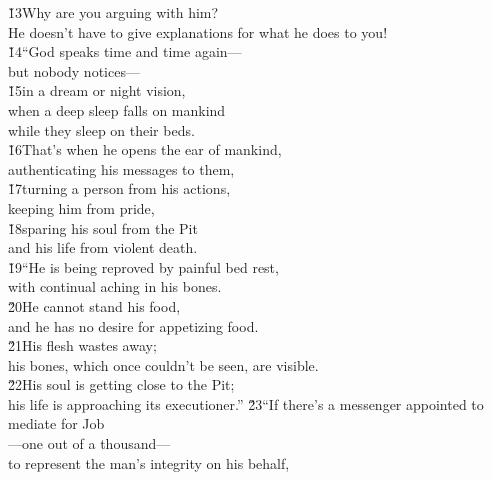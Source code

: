 \begin{poetry}
\poeml \v{13}Why are you arguing with him? \\
\poemll    He doesn't have to give explanations for what he does to you! \\
\poeml \v{14}``God speaks time and time again--- \\
\poemll    but nobody notices--- \\
\poeml \v{15}in a dream or night vision, \\
\poemll    when a deep sleep falls on mankind \\
\poemlll       while they sleep on their beds. \\
\poeml \v{16}That's when he opens the ear of mankind, \\
\poemll    authenticating his messages to them, \\
\poeml \v{17}turning a person from his actions, \\
\poemll    keeping him from pride, \\
\poeml \v{18}sparing his soul from the Pit \\
\poemll    and his life from violent death. \\
\poeml \v{19}``He is being reproved by painful bed rest, \\
\poemll    with continual aching in his bones. \\
\poeml \v{20}He cannot stand his food, \\
\poemll    and he has no desire for appetizing food. \\
\poeml \v{21}His flesh wastes away; \\
\poemll    his bones, which once couldn't be seen, are visible. \\
\poeml \v{22}His soul is getting close to the Pit; \\
\poemll    his life is approaching its executioner.''
\poeml \v{23}``If there's a messenger appointed to mediate for Job \\
\poemll    ---one out of a thousand--- \\
\poemlll       to represent the man's integrity on his behalf, \\

\end{poetry}
